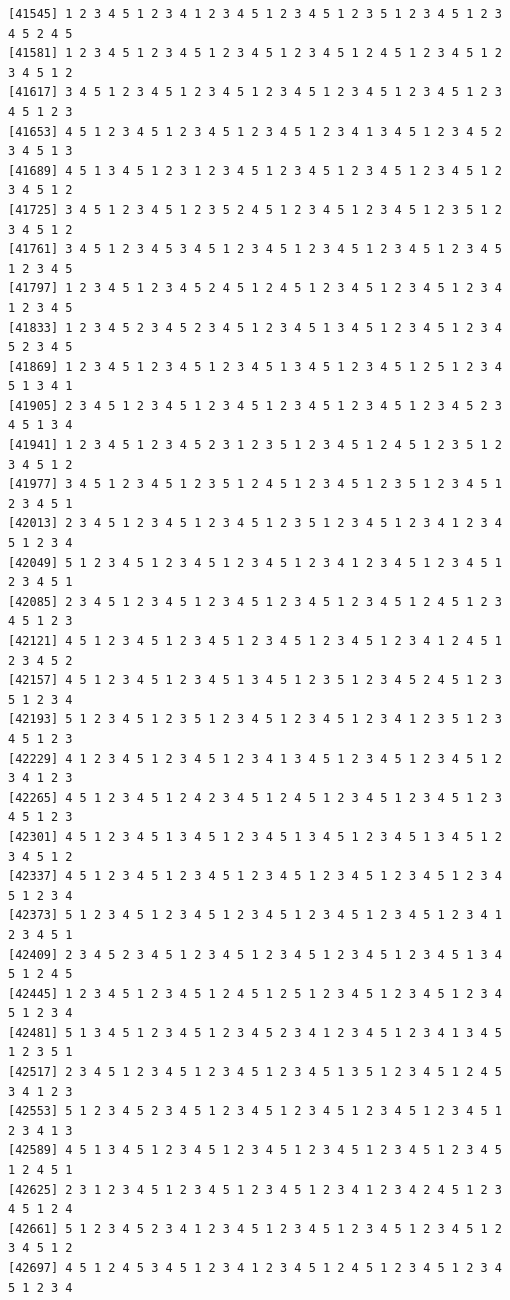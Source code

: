 \documentclass[
  english,
]{book}
\begin{document}
\begin{verbatim}
[41545] 1 2 3 4 5 1 2 3 4 1 2 3 4 5 1 2 3 4 5 1 2 3 5 1 2 3 4 5 1 2 3 4 5 2 4 5
[41581] 1 2 3 4 5 1 2 3 4 5 1 2 3 4 5 1 2 3 4 5 1 2 4 5 1 2 3 4 5 1 2 3 4 5 1 2
[41617] 3 4 5 1 2 3 4 5 1 2 3 4 5 1 2 3 4 5 1 2 3 4 5 1 2 3 4 5 1 2 3 4 5 1 2 3
[41653] 4 5 1 2 3 4 5 1 2 3 4 5 1 2 3 4 5 1 2 3 4 1 3 4 5 1 2 3 4 5 2 3 4 5 1 3
[41689] 4 5 1 3 4 5 1 2 3 1 2 3 4 5 1 2 3 4 5 1 2 3 4 5 1 2 3 4 5 1 2 3 4 5 1 2
[41725] 3 4 5 1 2 3 4 5 1 2 3 5 2 4 5 1 2 3 4 5 1 2 3 4 5 1 2 3 5 1 2 3 4 5 1 2
[41761] 3 4 5 1 2 3 4 5 3 4 5 1 2 3 4 5 1 2 3 4 5 1 2 3 4 5 1 2 3 4 5 1 2 3 4 5
[41797] 1 2 3 4 5 1 2 3 4 5 2 4 5 1 2 4 5 1 2 3 4 5 1 2 3 4 5 1 2 3 4 1 2 3 4 5
[41833] 1 2 3 4 5 2 3 4 5 2 3 4 5 1 2 3 4 5 1 3 4 5 1 2 3 4 5 1 2 3 4 5 2 3 4 5
[41869] 1 2 3 4 5 1 2 3 4 5 1 2 3 4 5 1 3 4 5 1 2 3 4 5 1 2 5 1 2 3 4 5 1 3 4 1
[41905] 2 3 4 5 1 2 3 4 5 1 2 3 4 5 1 2 3 4 5 1 2 3 4 5 1 2 3 4 5 2 3 4 5 1 3 4
[41941] 1 2 3 4 5 1 2 3 4 5 2 3 1 2 3 5 1 2 3 4 5 1 2 4 5 1 2 3 5 1 2 3 4 5 1 2
[41977] 3 4 5 1 2 3 4 5 1 2 3 5 1 2 4 5 1 2 3 4 5 1 2 3 5 1 2 3 4 5 1 2 3 4 5 1
[42013] 2 3 4 5 1 2 3 4 5 1 2 3 4 5 1 2 3 5 1 2 3 4 5 1 2 3 4 1 2 3 4 5 1 2 3 4
[42049] 5 1 2 3 4 5 1 2 3 4 5 1 2 3 4 5 1 2 3 4 1 2 3 4 5 1 2 3 4 5 1 2 3 4 5 1
[42085] 2 3 4 5 1 2 3 4 5 1 2 3 4 5 1 2 3 4 5 1 2 3 4 5 1 2 4 5 1 2 3 4 5 1 2 3
[42121] 4 5 1 2 3 4 5 1 2 3 4 5 1 2 3 4 5 1 2 3 4 5 1 2 3 4 1 2 4 5 1 2 3 4 5 2
[42157] 4 5 1 2 3 4 5 1 2 3 4 5 1 3 4 5 1 2 3 5 1 2 3 4 5 2 4 5 1 2 3 5 1 2 3 4
[42193] 5 1 2 3 4 5 1 2 3 5 1 2 3 4 5 1 2 3 4 5 1 2 3 4 1 2 3 5 1 2 3 4 5 1 2 3
[42229] 4 1 2 3 4 5 1 2 3 4 5 1 2 3 4 1 3 4 5 1 2 3 4 5 1 2 3 4 5 1 2 3 4 1 2 3
[42265] 4 5 1 2 3 4 5 1 2 4 2 3 4 5 1 2 4 5 1 2 3 4 5 1 2 3 4 5 1 2 3 4 5 1 2 3
[42301] 4 5 1 2 3 4 5 1 3 4 5 1 2 3 4 5 1 3 4 5 1 2 3 4 5 1 3 4 5 1 2 3 4 5 1 2
[42337] 4 5 1 2 3 4 5 1 2 3 4 5 1 2 3 4 5 1 2 3 4 5 1 2 3 4 5 1 2 3 4 5 1 2 3 4
[42373] 5 1 2 3 4 5 1 2 3 4 5 1 2 3 4 5 1 2 3 4 5 1 2 3 4 5 1 2 3 4 1 2 3 4 5 1
[42409] 2 3 4 5 2 3 4 5 1 2 3 4 5 1 2 3 4 5 1 2 3 4 5 1 2 3 4 5 1 3 4 5 1 2 4 5
[42445] 1 2 3 4 5 1 2 3 4 5 1 2 4 5 1 2 5 1 2 3 4 5 1 2 3 4 5 1 2 3 4 5 1 2 3 4
[42481] 5 1 3 4 5 1 2 3 4 5 1 2 3 4 5 2 3 4 1 2 3 4 5 1 2 3 4 1 3 4 5 1 2 3 5 1
[42517] 2 3 4 5 1 2 3 4 5 1 2 3 4 5 1 2 3 4 5 1 3 5 1 2 3 4 5 1 2 4 5 3 4 1 2 3
[42553] 5 1 2 3 4 5 2 3 4 5 1 2 3 4 5 1 2 3 4 5 1 2 3 4 5 1 2 3 4 5 1 2 3 4 1 3
[42589] 4 5 1 3 4 5 1 2 3 4 5 1 2 3 4 5 1 2 3 4 5 1 2 3 4 5 1 2 3 4 5 1 2 4 5 1
[42625] 2 3 1 2 3 4 5 1 2 3 4 5 1 2 3 4 5 1 2 3 4 1 2 3 4 2 4 5 1 2 3 4 5 1 2 4
[42661] 5 1 2 3 4 5 2 3 4 1 2 3 4 5 1 2 3 4 5 1 2 3 4 5 1 2 3 4 5 1 2 3 4 5 1 2
[42697] 4 5 1 2 4 5 3 4 5 1 2 3 4 1 2 3 4 5 1 2 4 5 1 2 3 4 5 1 2 3 4 5 1 2 3 4

\end{verbatim}
\end{document}
